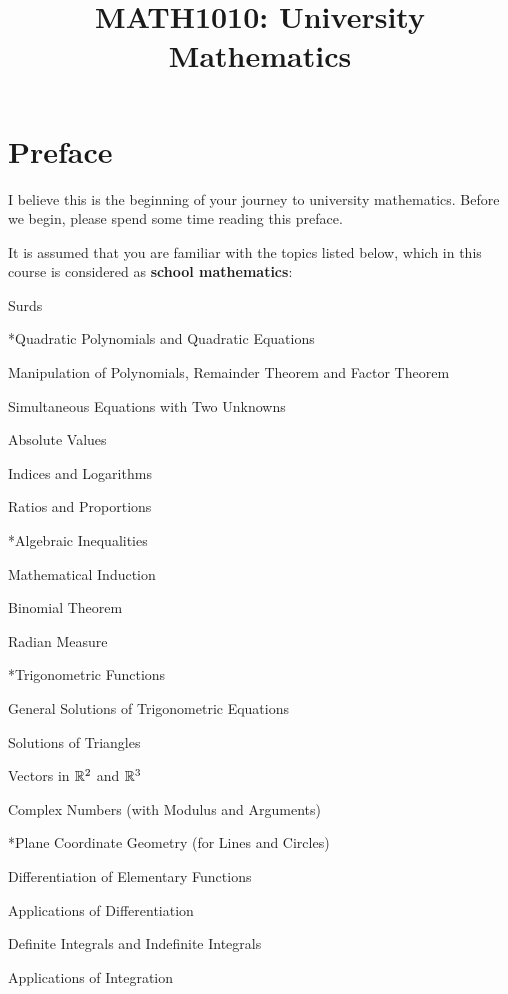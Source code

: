 \documentclass[a4paper,12pt]{article}
\begin{document}
\title{MATH1010: University Mathematics}





\section*{Preface}
I believe this is the beginning of your journey to university mathematics. Before we begin, please spend some time reading this preface.\n

It is assumed that you are familiar with the topics listed below, which in this course is considered as \textbf{school mathematics}:
\begin{alist}
  \item Surds
  \item **Quadratic Polynomials and Quadratic Equations
  \item Manipulation of Polynomials, Remainder Theorem and Factor Theorem
  \item Simultaneous Equations with Two Unknowns
  \item *Absolute Values
  \item Indices and Logarithms
  \item Ratios and Proportions
  \item **Algebraic Inequalities
  \item *Mathematical Induction
  \item *Binomial Theorem
  \item *Radian Measure
  \item **Trigonometric Functions
  \item *General Solutions of Trigonometric Equations
  \item *Solutions of Triangles
  \item *Vectors in $\mathbb{R}^{2}$ and $\mathbb{R}^{3}$
  \item *Complex Numbers (with Modulus and Arguments)
  \item **Plane Coordinate Geometry (for Lines and Circles)
  \item *Differentiation of Elementary Functions
  \item *Applications of Differentiation
  \item *Definite Integrals and Indefinite Integrals
  \item *Applications of Integration
\end{alist}
\pagebreak
\end{document}
